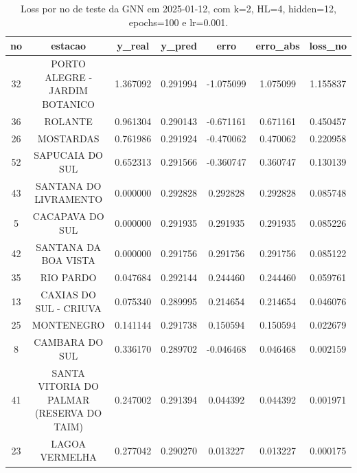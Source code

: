 \begin{table}[h]
\centering
\caption{Loss por no de teste da GNN em 2025-01-12, com k=2, HL=4, hidden=12, epochs=100 e lr=0.001.}
\label{tab:gnn_loss_k2_hl4_h12_e100_d20250112}
\begin{tabular}{ccccccc}
\toprule
no & estacao & y\_real & y\_pred & erro & erro\_abs & loss\_no \\
\midrule
32 & PORTO ALEGRE - JARDIM BOTANICO & 1.367092 & 0.291994 & -1.075099 & 1.075099 & 1.155837 \\
36 & ROLANTE & 0.961304 & 0.290143 & -0.671161 & 0.671161 & 0.450457 \\
26 & MOSTARDAS & 0.761986 & 0.291924 & -0.470062 & 0.470062 & 0.220958 \\
52 & SAPUCAIA DO SUL & 0.652313 & 0.291566 & -0.360747 & 0.360747 & 0.130139 \\
43 & SANTANA DO LIVRAMENTO & 0.000000 & 0.292828 & 0.292828 & 0.292828 & 0.085748 \\
5 & CACAPAVA DO SUL & 0.000000 & 0.291935 & 0.291935 & 0.291935 & 0.085226 \\
42 & SANTANA DA BOA VISTA & 0.000000 & 0.291756 & 0.291756 & 0.291756 & 0.085122 \\
35 & RIO PARDO & 0.047684 & 0.292144 & 0.244460 & 0.244460 & 0.059761 \\
13 & CAXIAS DO SUL - CRIUVA & 0.075340 & 0.289995 & 0.214654 & 0.214654 & 0.046076 \\
25 & MONTENEGRO & 0.141144 & 0.291738 & 0.150594 & 0.150594 & 0.022679 \\
8 & CAMBARA DO SUL & 0.336170 & 0.289702 & -0.046468 & 0.046468 & 0.002159 \\
41 & SANTA VITORIA DO PALMAR (RESERVA DO TAIM) & 0.247002 & 0.291394 & 0.044392 & 0.044392 & 0.001971 \\
23 & LAGOA VERMELHA & 0.277042 & 0.290270 & 0.013227 & 0.013227 & 0.000175 \\
\bottomrule
\end{tabular}
\end{table}
